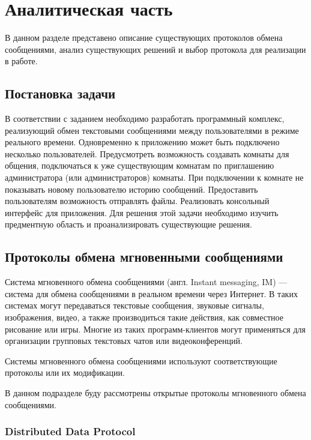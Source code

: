 \chapter{Аналитическая часть}

В данном разделе представено описание существующих протоколов обмена сообщениями, анализ существующих решений и выбор протокола для реализации в работе.

\section{Постановка задачи}

В соответствии с заданием необходимо разработать программный комплекс, реализующий обмен текстовыми сообщениями между пользователями в режиме реального времени. Одновременно к приложению может быть подключено несколько пользователей. Предусмотреть возможность создавать комнаты для общения, подключаться к уже существующим комнатам по приглашению администратора (или администраторов) комнаты. При подключении к комнате не показывать новому пользователю историю сообщений. Предоставить пользователям возможность отправлять файлы. Реализовать консольный интерфейс для приложения. Для решения этой задачи необходимо изучить предментную область и проанализировать существующие решения.

\section{Протоколы обмена мгновенными сообщениями}

Система мгновенного обмена сообщениями \cite{im} (англ. Instant messaging, IM) — система для обмена сообщениями в реальном времени через Интернет. В таких системах могут передаваться текстовые сообщения, звуковые сигналы, изображения, видео, а также производиться такие действия, как совместное рисование или игры. Многие из таких программ-клиентов могут применяться для организации групповых текстовых чатов или видеоконференций.

Системы мгновенного обмена сообщениями используют соответствующие протоколы или их модификации.

В данном подразделе буду рассмотрены открытые протоколы мгновенного обмена сообщениями.

\subsection{Distributed Data Protocol}

